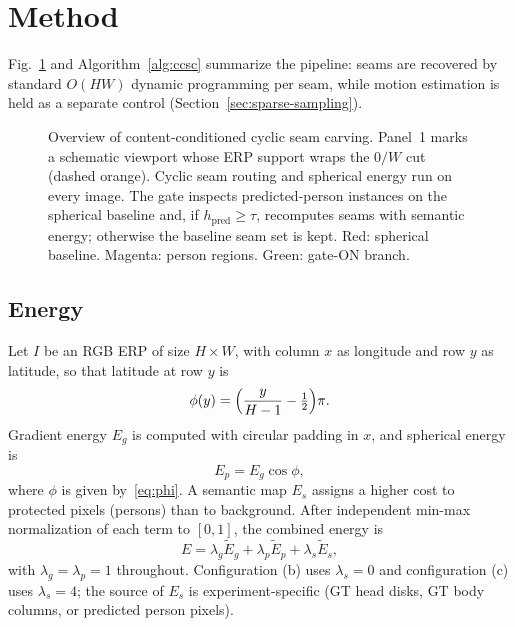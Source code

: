 \section{Method}
\label{sec:method}

Fig.~\ref{fig:method} and Algorithm~\ref{alg:ccsc} summarize the
pipeline: seams are recovered by standard $O(HW)$ dynamic
programming per seam, while motion estimation is held as a
separate control (Section~\ref{sec:sparse-sampling}).

\begin{figure}[!t]
\centering
\resizebox{\textwidth}{!}{}
\caption{Overview of content-conditioned cyclic seam carving.
Panel~1 marks a schematic viewport whose ERP support wraps the
$0/W$ cut (dashed orange). Cyclic seam routing and spherical
energy run on every image. The gate inspects predicted-person
instances on the spherical baseline and, if
$h_{\mathrm{pred}}\ge\tau$, recomputes seams with semantic
energy; otherwise the baseline seam set is kept. Red: spherical
baseline. Magenta: person regions. Green: gate-ON branch.}
\label{fig:method}
\end{figure}

\subsection{Energy}
\label{sec:energy}

Let $I$ be an RGB ERP of size $H\times W$, with column $x$ as
longitude and row $y$ as latitude, so that latitude at row $y$ is
\begin{equation}
\label{eq:phi}
\phi(y)=\Bigl(\frac{y}{H-1}-\tfrac12\Bigr)\pi.
\end{equation}
Gradient energy $E_g$ is computed with circular padding in $x$,
and spherical energy is
\begin{equation}
\label{eq:ep}
E_p=E_g\cos\phi,
\end{equation}
where $\phi$ is given by~\eqref{eq:phi}. A semantic map $E_s$
assigns a higher cost to protected pixels (persons) than to
background. After independent min-max normalization of each term
to $[0,1]$, the combined energy is
\begin{equation}
\label{eq:combine}
E=\lambda_g\tilde E_g+\lambda_p\tilde E_p+\lambda_s\tilde E_s,
\end{equation}
with $\lambda_g=\lambda_p=1$ throughout. Configuration (b) uses
$\lambda_s=0$ and configuration (c) uses $\lambda_s=4$; the source
of $E_s$ is experiment-specific (GT head disks, GT body columns,
or predicted person pixels).

